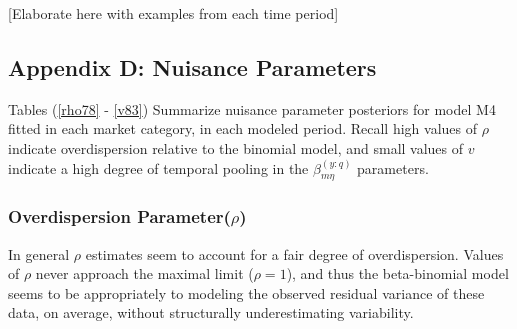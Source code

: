\documentclass[12pt]{article}
\begin{document}
[Elaborate here with examples from each time period]

%
\clearpage
%

\subsection{Appendix D: Nuisance Parameters}\label{appNu}

Tables (\ref{rho78} - \ref{v83}) Summarize nuisance parameter posteriors for model M4 fitted
in each market category, in each modeled period. Recall high values of
\(\rho\) indicate overdispersion relative to the binomial model, and
small values of \(v\) indicate a high degree of temporal pooling in the
\(\beta^{(y:q)}_{m\eta}\) parameters.

\subsubsection{Overdispersion Parameter(\(\rho\))}

In general \(\rho\) estimates seem to account for a fair degree of
overdispersion. Values of \(\rho\) never approach the maximal limit
(\(\rho=1\)), and thus the beta-binomial model seems to be appropriately
to modeling the observed residual variance of these data, on average,
without structurally underestimating variability.
\end{document}
